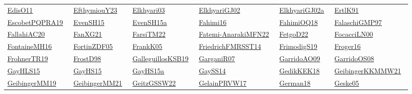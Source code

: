 \begin{longtable}{*{6}{l}}
\href{works/EdisO11.pdf}{EdisO11}~\cite{EdisO11} & \href{works/EfthymiouY23.pdf}{EfthymiouY23}~\cite{EfthymiouY23} & \href{works/Elkhyari03.pdf}{Elkhyari03}~\cite{Elkhyari03} & \href{works/ElkhyariGJ02.pdf}{ElkhyariGJ02}~\cite{ElkhyariGJ02} & \href{works/ElkhyariGJ02a.pdf}{ElkhyariGJ02a}~\cite{ElkhyariGJ02a} & \href{works/ErtlK91.pdf}{ErtlK91}~\cite{ErtlK91}\\ 
\href{works/EscobetPQPRA19.pdf}{EscobetPQPRA19}~\cite{EscobetPQPRA19} & \href{works/EvenSH15.pdf}{EvenSH15}~\cite{EvenSH15} & \href{works/EvenSH15a.pdf}{EvenSH15a}~\cite{EvenSH15a} & \href{works/Fahimi16.pdf}{Fahimi16}~\cite{Fahimi16} & \href{works/FahimiOQ18.pdf}{FahimiOQ18}~\cite{FahimiOQ18} & \href{works/FalaschiGMP97.pdf}{FalaschiGMP97}~\cite{FalaschiGMP97}\\ 
\href{works/FallahiAC20.pdf}{FallahiAC20}~\cite{FallahiAC20} & \href{works/FanXG21.pdf}{FanXG21}~\cite{FanXG21} & \href{works/FarsiTM22.pdf}{FarsiTM22}~\cite{FarsiTM22} & \href{}{Fatemi-AnarakiMFN22}~\cite{Fatemi-AnarakiMFN22} & \href{works/FetgoD22.pdf}{FetgoD22}~\cite{FetgoD22} & \href{works/FocacciLN00.pdf}{FocacciLN00}~\cite{FocacciLN00}\\ 
\href{works/FontaineMH16.pdf}{FontaineMH16}~\cite{FontaineMH16} & \href{works/FortinZDF05.pdf}{FortinZDF05}~\cite{FortinZDF05} & \href{works/FrankK05.pdf}{FrankK05}~\cite{FrankK05} & \href{}{FriedrichFMRSST14}~\cite{FriedrichFMRSST14} & \href{works/FrimodigS19.pdf}{FrimodigS19}~\cite{FrimodigS19} & \href{works/Froger16.pdf}{Froger16}~\cite{Froger16}\\ 
\href{works/FrohnerTR19.pdf}{FrohnerTR19}~\cite{FrohnerTR19} & \href{works/FrostD98.pdf}{FrostD98}~\cite{FrostD98} & \href{works/GalleguillosKSB19.pdf}{GalleguillosKSB19}~\cite{GalleguillosKSB19} & \href{works/GarganiR07.pdf}{GarganiR07}~\cite{GarganiR07} & \href{works/GarridoAO09.pdf}{GarridoAO09}~\cite{GarridoAO09} & \href{works/GarridoOS08.pdf}{GarridoOS08}~\cite{GarridoOS08}\\ 
\href{works/GayHLS15.pdf}{GayHLS15}~\cite{GayHLS15} & \href{works/GayHS15.pdf}{GayHS15}~\cite{GayHS15} & \href{works/GayHS15a.pdf}{GayHS15a}~\cite{GayHS15a} & \href{works/GaySS14.pdf}{GaySS14}~\cite{GaySS14} & \href{works/GedikKEK18.pdf}{GedikKEK18}~\cite{GedikKEK18} & \href{works/GeibingerKKMMW21.pdf}{GeibingerKKMMW21}~\cite{GeibingerKKMMW21}\\ 
\href{works/GeibingerMM19.pdf}{GeibingerMM19}~\cite{GeibingerMM19} & \href{works/GeibingerMM21.pdf}{GeibingerMM21}~\cite{GeibingerMM21} & \href{works/GeitzGSSW22.pdf}{GeitzGSSW22}~\cite{GeitzGSSW22} & \href{works/GelainPRVW17.pdf}{GelainPRVW17}~\cite{GelainPRVW17} & \href{works/German18.pdf}{German18}~\cite{German18} & \href{works/Geske05.pdf}{Geske05}~\cite{Geske05}\\ 

\end{longtable}
